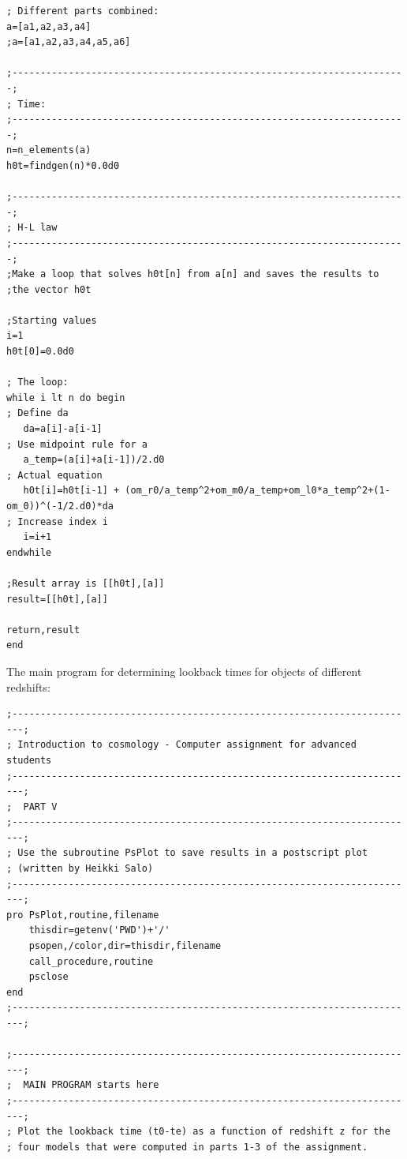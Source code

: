 \documentclass[a4paper,12pt]{article}
\begin{document}
\begin{itemize}
\begin{scriptsize}
\begin{verbatim}
; Different parts combined:
a=[a1,a2,a3,a4]
;a=[a1,a2,a3,a4,a5,a6]

;----------------------------------------------------------------------;
; Time:
;----------------------------------------------------------------------;
n=n_elements(a)
h0t=findgen(n)*0.0d0

;----------------------------------------------------------------------;
; H-L law
;----------------------------------------------------------------------;
;Make a loop that solves h0t[n] from a[n] and saves the results to
;the vector h0t

;Starting values
i=1
h0t[0]=0.0d0

; The loop:
while i lt n do begin
; Define da
   da=a[i]-a[i-1]
; Use midpoint rule for a
   a_temp=(a[i]+a[i-1])/2.d0
; Actual equation
   h0t[i]=h0t[i-1] + (om_r0/a_temp^2+om_m0/a_temp+om_l0*a_temp^2+(1-om_0))^(-1/2.d0)*da
; Increase index i
   i=i+1
endwhile

;Result array is [[h0t],[a]]
result=[[h0t],[a]]

return,result
end
\end{verbatim}
\end{scriptsize}

\vspace{0.5cm}

The main program for determining lookback times for objects of different redshifts:

\begin{scriptsize}
\begin{verbatim}
;------------------------------------------------------------------------;
; Introduction to cosmology - Computer assignment for advanced students
;------------------------------------------------------------------------;
;  PART V
;------------------------------------------------------------------------;
; Use the subroutine PsPlot to save results in a postscript plot 
; (written by Heikki Salo)
;------------------------------------------------------------------------;
pro PsPlot,routine,filename
	thisdir=getenv('PWD')+'/'
	psopen,/color,dir=thisdir,filename
	call_procedure,routine
	psclose		
end
;------------------------------------------------------------------------;

;------------------------------------------------------------------------;
;  MAIN PROGRAM starts here
;------------------------------------------------------------------------;
; Plot the lookback time (t0-te) as a function of redshift z for the
; four models that were computed in parts 1-3 of the assignment.


\end{verbatim}
\end{scriptsize}
\end{itemize}
\end{document}
